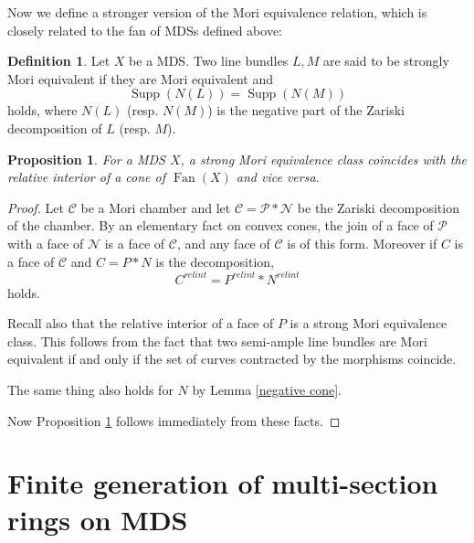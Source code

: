 \documentclass[12pt,twoside]{amsart}
\newtheorem{prop}[theo]{Proposition}
\theoremstyle{definition}
\newtheorem{defi}[theo]{Definition}
\newcommand\Supp{\mathop{\mathrm{Supp}}\nolimits}
\newcommand\Fan{\mathop{\mathrm{Fan}}}
\begin{document}
Now we define a stronger version of the Mori equivalence relation, which is closely related to
the fan of MDSs defined above:
\begin{defi}\label{strong Mori equivalence}
Let $X$ be a MDS. Two line bundles $L, M$ are said to be strongly Mori equivalent if
they are Mori equivalent and
\begin{equation*}
\Supp{(N(L))}=\Supp{(N(M))}
\end{equation*}
holds, where $N(L)$ (resp. $N(M)$) is the negative part of the Zariski decomposition of $L$ (resp. $M$).
\end{defi}

\begin{prop}\label{fan vs strong Mori equivalence}
For a MDS $X$, a strong Mori equivalence class coincides with the relative interior of a cone of
$\Fan{(X)}$ and vice versa.
\end{prop}
\begin{proof}
Let $\mathcal{C}$ be a Mori chamber and let $\mathcal{C}=\mathcal{P}*\mathcal{N}$ be the Zariski
decomposition of the chamber. By an elementary fact on convex cones, the join of a face of $\mathcal{P}$
with a face of $\mathcal{N}$ is a face of $\mathcal{C}$, and any face of $\mathcal{C}$ is of this form.
Moreover if $C$ is a face of $\mathcal{C}$ and $C=P*N$ is the decomposition,
\begin{equation*}
C^{relint}=P^{relint}*N^{relint}
\end{equation*}
holds.

Recall also that the relative interior of a face of $P$ is a strong Mori equivalence class.
This follows from the fact that two semi-ample line bundles are Mori equivalent if and only if
the set of curves contracted by the morphisms coincide.

The same thing also holds for $N$ by Lemma \ref{negative cone}.

Now Proposition \ref{fan vs strong Mori equivalence} follows immediately from these facts.


\end{proof}



\section{Finite generation of multi-section rings on MDS}\label{Finite generation of multi-section rings on MDS}
\end{document}
